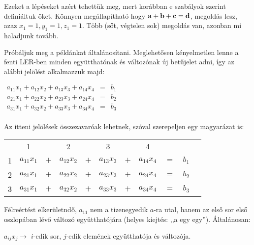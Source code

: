 \documentclass[a4paper,11.5pt]{article}
\begin{document}
	\noindent Ezeket a lépéseket azért tehettük meg, mert korábban e szabályok szerint definiáltuk őket. Könnyen megállapítható hogy $\textbf{a}+\textbf{b}+\textbf{c}=\textbf{d}$, megoldás lesz, azaz $x_1=1, y_1=1, z_1=1$. Több (sőt, végtelen sok) megoldás van, azonban mi haladjunk tovább.
	
	Próbáljuk meg a példánkat általánosítani. Meglehetősen kényelmetlen lenne a fenti LER-ben minden együtthatónak és változónak új betűjelet adni, így az alábbi jelölést alkalmazzuk majd:
	
	\begin{center}
		$\begin{matrix}
		a_{11}x_{1} + a_{12}x_{2} + a_{13}x_{3} + a_{14}x_{4} &=& b_{1}\\
		a_{21}x_{1} + a_{22}x_{2} + a_{23}x_{3} + a_{24}x_{4} &=& b_{2}\\
		a_{31}x_{1} + a_{32}x_{2} + a_{33}x_{3} + a_{34}x_{4} &=& b_{3}\\
		\end{matrix}$
	\end{center}
	
	\noindent Az itteni jelölések összezavaróak lehetnek, szóval szerepeljen egy magyarázat is:
	
	
	\begin{center}
		\setlength{\extrarowheight}{7pt}
	\begin{tabular}{cc|c|c|c|c|c|cccc}
		&{\LARGE 1}&&{\LARGE2}&&{\LARGE3}&&{\LARGE4}&&\\
		{\LARGE 1}&$a_{11}x_{1} $&$+$&$ a_{12}x_{2}$ &$+$&$ a_{13}x_{3}$ &$+$& $a_{14}x_{4}$ &$=$& $b_{1}$\\
		\hline
		{\LARGE 2}&$a_{21}x_{1} $&$+$&$ a_{22}x_{2}$ &$+$&$ a_{23}x_{3}$ &$+$&$ a_{24}x_{4}$ &$=$& $b_{2}$\\
		\hline
		{\LARGE 3}&$a_{31}x_{1}$ &$+$& $a_{32}x_{2}$ &$+$&$ a_{33}x_{3} $&$+$&$ a_{34}x_{4}$ &$=$& $b_{3}$\\
	\end{tabular}
	\end{center}
	
	\noindent Félreértést elkerületndő, $a_{11}$ nem a tizenegyedik $a$-ra utal, hanem az első sor első oszlopában lévő változó együtthatójára (helyes kiejtés: ,,a egy egy''). Általánosan:
	
	
	\begin{center}
		$a_{ij}x_j \rightarrow$ $i$-edik sor, $j$-edik elemének együtthatója és változója.
	\end{center}
	
\end{document}
